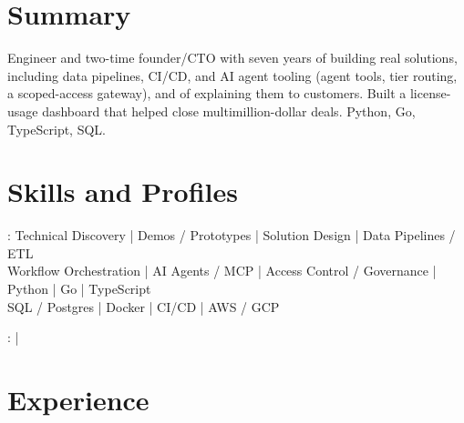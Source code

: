 \documentclass[print]{jack-resume}
\begin{document}
\pagecolor{darkmodeBackground}


\begin{minipage}[t][1cm][t]{.03\textwidth}
    \hfill
\end{minipage}

\section{Summary}
Engineer and two-time founder/CTO with seven years of building real solutions, including data pipelines, CI/CD, and AI agent tooling (agent tools, tier routing, a scoped-access gateway), and of explaining them to customers. Built a license-usage dashboard that helped close multimillion-dollar deals. Python, Go, TypeScript, SQL.
\sectionsep

\section{Skills and Profiles}
:
Technical Discovery \hfill | \hfill
Demos / Prototypes \hfill | \hfill
Solution Design \hfill | \hfill
Data Pipelines / ETL \\
\hspace{1.0cm} Workflow Orchestration \hfill | \hfill
AI Agents / MCP \hfill | \hfill
Access Control / Governance \hfill | \hfill
Python \hfill | \hfill
Go \hfill | \hfill
TypeScript \\
\hspace{1.0cm} SQL / Postgres \hfill | \hfill
Docker \hfill | \hfill
CI/CD \hfill | \hfill
AWS / GCP \\

\raggedright{
    :
      \href{https://www.linkedin.com/in/jack-sturtevant/}{ \ExternalLink} |
     \href{https://github.com/jacksturt}{ \ExternalLink}}

\section{Experience}
\end{document}
